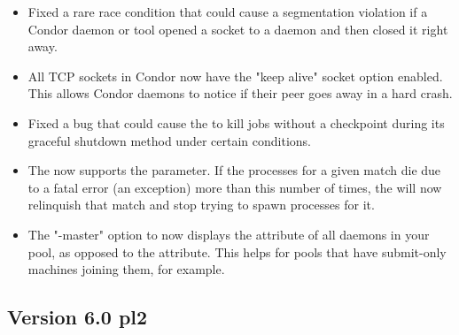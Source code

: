 \begin{itemize}
\item Fixed a rare race condition that could cause a segmentation
violation if a Condor daemon or tool opened a socket to a daemon and
then closed it right away.

\item All TCP sockets in Condor now have the "keep alive" socket option
enabled.
This allows Condor daemons to notice if their peer goes away in a hard
crash.

\item Fixed a bug that could cause the  to kill jobs
without a checkpoint during its graceful shutdown method under certain
conditions.

\item The  now supports the
 parameter.
If the  processes for a given match die due to a fatal
error (an exception) more than this number of times, the
 will now relinquish that match and stop trying to
spawn  processes for it.

\item The "-master" option to  now displays the 
attribute of all  daemons in your pool, as opposed
to the  attribute.
This helps for pools that have submit-only machines joining them, for
example.

\end{itemize}

\subsection{\label{sec:New-6-0-pl2}Version 6.0 pl2}

